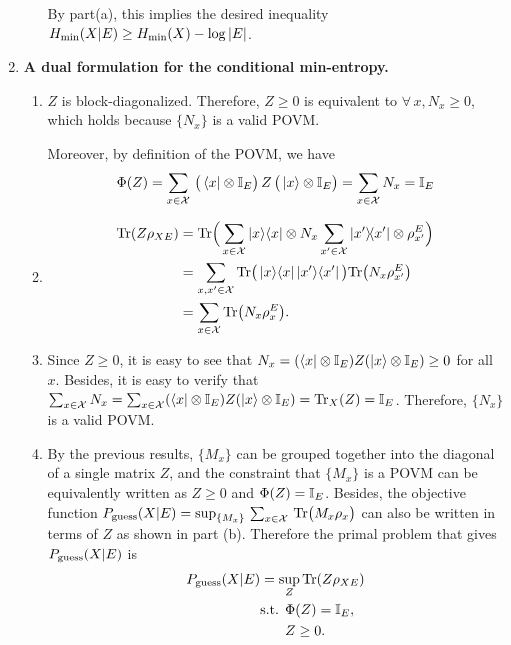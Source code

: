 \documentclass[12pt]{article}
\newcommand{\pguess}{P_{\rm guess}}
\begin{document}
\begin{enumerate}
\begin{enumerate}
By part(a), this implies the desired inequality $H_{\rm min}(X|E) \geq H_{\rm min}(X) - \log |E|$.
\end{enumerate}

\item \textbf{A dual formulation for the conditional min-entropy. }
\begin{enumerate}
\item $Z$ is block-diagonalized. Therefore, $Z \ge 0$ is equivalent to $\forall\, x, N_x \ge 0$, which holds because $\{N_x\}$ is a valid POVM. 

Moreover, by definition of the POVM, we have
\begin{align*}
\Phi(Z) = \sum_{x\in\mathcal{X}} \,\big(\bra{x} \otimes \mathbb{I}_E\big) \,Z\, \big(\ket{x}\otimes\mathbb{I}_E\big) = \sum_{x\in\mathcal{X}} N_x = \mathbb{I}_E	
\end{align*}
\item 
\begin{align*}
\mathrm{Tr}(Z\rho_{XE})
&= \mathrm{Tr} \Big( \sum_{x\in \mathcal{X}} \ket{x}\!\bra{x} \otimes N_x \sum_{x'\in\mathcal{X}} \ket{x'}\!\!\bra{x'}\otimes \rho_{x'}^E \Big) \\
&= \sum_{x,x'\in \mathcal{X}} \mathrm{Tr} \big( \ket{x}\!\bra{x} \ket{x'}\!\bra{x'} \big)\mathrm{Tr} \big(N_x \rho^E_{x'}\big) \\
&= \sum_{x\in \mathcal{X}} \mathrm{Tr} \big(N_x \rho^E_{x}\big).
\end{align*}
\item Since $Z \ge 0$, it is easy to see that $N_x = (\bra{x} \otimes \mathbb{I}_E) Z (\ket{x}\otimes\mathbb{I}_E) \ge 0$ for all $x$. Besides, it is easy to verify that$\sum_{x \in \mathcal{X}}N_x = \sum_{x \in \mathcal{X}} (\bra{x} \otimes \mathbb{I}_E) Z (\ket{x}\otimes\mathbb{I}_E) = \mathrm{Tr}_{X}(Z) = \mathbb{I}_E$. Therefore, $\{N_x\}$ is a valid POVM.
\item By the previous results, $\{M_x\}$ can be grouped together into the diagonal of a single matrix $Z$, and the constraint that $\{M_x\}$ is a POVM can be equivalently written as $Z \ge 0$ and $\Phi(Z) = \mathbb{I}_E$. Besides, the objective function $\pguess(X|E) = \sup_{\{M_x\}}\,\sum_{x\in\mathcal{X}} \,\Tr\big(M_x\rho_x\big)$ can also be written in terms of $Z$ as shown in part (b). Therefore the primal problem that gives $\pguess(X|E)$ is
\[
\begin{aligned}
\pguess(X|E)
&= \sup_Z \Tr(Z \rho_{XE}) \\
&\text{s.t. } \Phi(Z) = \Id_E, \\
&\phantom{\text{s.t. }} Z \geq 0.
\end{aligned}
\]


\end{enumerate}
\end{enumerate}
\end{document}
